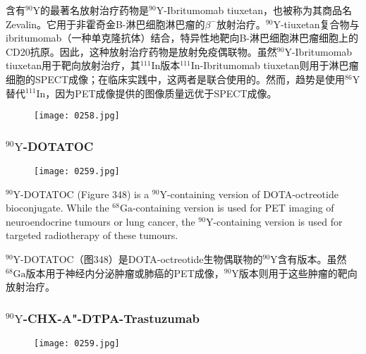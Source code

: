 \documentclass[dvipsnames, svgnames,a4paper,11pt]{article}
\begin{document}
含有\(\mathrm{^{90}Y}\)的最著名放射治疗药物是\(\mathrm{^{90}Y}\)-Ibritumomab tiuxetan，也被称为其商品名Zevalin。它用于非霍奇金B-淋巴细胞淋巴瘤的\(\beta^{-}\)放射治疗。\(\mathrm{^{90}Y}\)-tiuxetan复合物与ibritumomab（一种单克隆抗体）结合，特异性地靶向B-淋巴细胞淋巴瘤细胞上的CD20抗原。因此，这种放射治疗药物是放射免疫偶联物。虽然\(\mathrm{^{90}Y}\)-Ibritumomab tiuxetan用于靶向放射治疗，其\(\mathrm{^{111}In}\)版本\(\mathrm{^{111}In}\)-Ibritumomab tiuxetan则用于淋巴瘤细胞的SPECT成像；在临床实践中，这两者是联合使用的。然而，趋势是使用\(\mathrm{^{86}Y}\)替代\(\mathrm{^{111}In}\)，因为PET成像提供的图像质量远优于SPECT成像。

\begin{figure}[h]
    \centering
    \texttt{[image: 0258.jpg]}
     \label{fig347}
\end{figure}

\subsubsection{\(\mathrm{^{90}Y}\)-DOTATOC}

\begin{figure}[h]
    \centering
    \texttt{[image: 0259.jpg]}
     \label{fig348}
\end{figure}

\(\mathrm{^{90}Y}\)-DOTATOC (Figure 348) is a \(\mathrm{^{90}Y}\)-containing version of DOTA-octreotide bioconjugate. While the \(\mathrm{^{68}Ga}\)-containing version is used for PET imaging of neuroendocrine tumours or lung cancer, the \(\mathrm{^{90}Y}\)-containing version is used for targeted radiotherapy of these tumours.

\(\mathrm{^{90}Y}\)-DOTATOC（图348）是DOTA-octreotide生物偶联物的\(\mathrm{^{90}Y}\)含有版本。虽然\(\mathrm{^{68}Ga}\)版本用于神经内分泌肿瘤或肺癌的PET成像，\(\mathrm{^{90}Y}\)版本则用于这些肿瘤的靶向放射治疗。




\subsubsection{\(\mathrm{^{90}Y}\)-CHX-A"-DTPA-Trastuzumab}

\begin{figure}[h]
    \centering
    \texttt{[image: 0259.jpg]}
     \label{fig349}
\end{figure}
\end{document}
